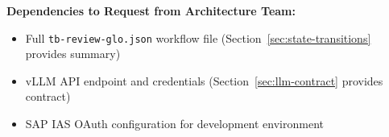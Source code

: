 \textbf{Dependencies to Request from Architecture Team:}
\begin{itemize}
    \item Full \texttt{tb-review-glo.json} workflow file (Section~\ref{sec:state-transitions} provides summary)
    \item vLLM API endpoint and credentials (Section~\ref{sec:llm-contract} provides contract)
    \item SAP IAS OAuth configuration for development environment
\end{itemize}


